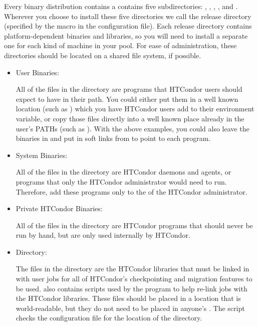 \begin{description}
\begin{description}
Every binary distribution contains a contains
five subdirectories: , , , ,
and . Wherever you
choose to install these five directories we call the release directory
(specified by the  macro in the configuration file).
Each
release directory contains platform-dependent binaries and libraries,
so you will need to install a separate one for each kind of machine in
your pool.  For ease of administration, these directories should be
located on a shared file system, if possible.

\begin{itemize}
     \item User Binaries:

     All of the files in the  directory are programs that
     HTCondor users should expect to have in their path.  You could
     either put them in a well known location (such as
     ) which you have HTCondor users add to
     their  environment variable, or copy those files
     directly into a well known place already in the user's PATHs (such as
     ).  With the above examples, you could also
     leave the binaries in  and put in
     soft links from  to point to each program.

     \item System Binaries:

     All of the files in the  directory are HTCondor daemons and
     agents, or programs that only the HTCondor administrator would need
     to run.  Therefore, add these programs only
     to the  of the HTCondor administrator.

     \item Private HTCondor Binaries:

     All of the files in the  directory are HTCondor
     programs that should never be run by hand, but are only used
     internally by HTCondor. 

     \item {} Directory:

     The files in the  directory are the HTCondor libraries that
     must be linked in with user jobs for all of HTCondor's
     checkpointing and migration features to be used.   also
     contains scripts used by the  program to help
     re-link jobs with the HTCondor libraries.  These files should be
     placed in a location that is world-readable, but they do not need
     to be placed in anyone's .  The  script checks
     the configuration file for the location of the  directory.


\end{itemize}
\end{description}
\end{description}
